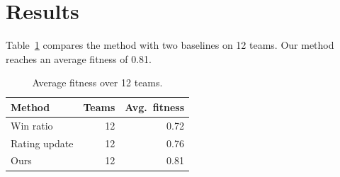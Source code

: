 \section{Results}
\label{sec:results}

Table~\ref{tab:results} compares the method with two baselines on 12 teams.
Our method reaches an average fitness of 0.81.

\begin{table}[t]
  \centering
  \caption{Average fitness over 12 teams.}
  \label{tab:results}
  \begin{tabular}{lrr}
    \toprule
    Method & Teams & Avg.\ fitness \\
    \midrule
    Win ratio & 12 & 0.72 \\
    Rating update & 12 & 0.76 \\
    Ours & 12 & 0.81 \\
    \bottomrule
  \end{tabular}
\end{table}
